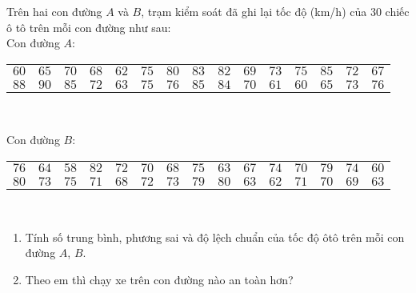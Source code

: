 \begin{bt}%
	Trên hai con đường $A$ và $B$, trạm kiểm soát đã ghi lại tốc độ (km/h) của $30$ chiếc ô tô trên mỗi con đường như sau:\\
Con đường $A$:
\begin{center}
	\begin{tabular}{|lcccccccccccccc|}
		\hline 
		$60$&$65$&$70$&$68$&$62$&$75$&$80$&$83$&$82$&$69$&$73$&$75$&$85$&$72$&$67$\\
		$88$&$90$&$85$&$72$&$63$&$75$&$76$&$85$&$84$&$70$&$61$&$60$&$65$&$73$&$76$\\ 
		\hline 
	\end{tabular}\\
\end{center}	
Con đường $B$:
\begin{center}
	\begin{tabular}{|lcccccccccccccc|}
		\hline 
		$76$&$64$&$58$&$82$&$72$&$70$&$68$&$75$&$63$&$67$&$74$&$70$&$79$&$74$&$60$\\
		$80$&$73$&$75$&$71$&$68$&$72$&$73$&$79$&$80$&$63$&$62$&$71$&$70$&$69$&$63$\\
		\hline 
	\end{tabular}\\
\end{center}
\begin{enumerate}
	\item Tính số trung bình, phương sai và độ lệch chuẩn của tốc độ ôtô trên mỗi con đường $A$, $B$.
	\item Theo em thì chạy xe trên con đường nào an toàn hơn?
\end{enumerate}
\end{bt}